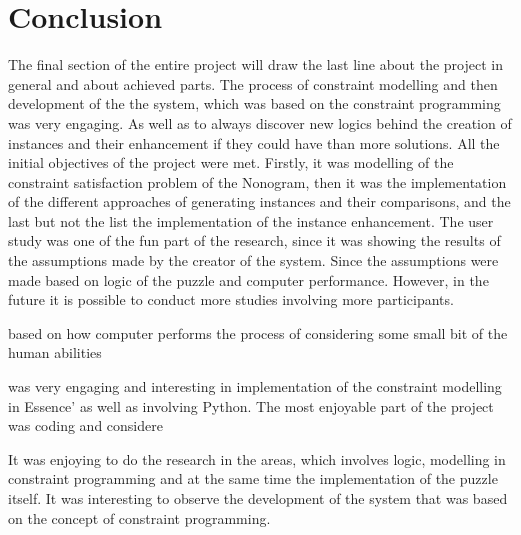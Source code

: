 \section{Conclusion}
The final section of the entire project will draw the last line about the project in general and about achieved parts. The process of constraint modelling and then development of the the system, which was based on the constraint programming was very engaging. As well as to always discover new logics behind the creation of instances and their enhancement if they could have than more solutions. All the initial objectives of the project were met. Firstly, it was modelling of the constraint satisfaction problem of the Nonogram, then it was the implementation of the different approaches of generating instances and their comparisons, and the last but not the list the implementation of the instance enhancement. The user study was one of the fun part of the research, since it was showing the results of the assumptions made  by the creator of the system. Since the assumptions were made based on logic of the puzzle and computer performance. However, in the future it is possible to conduct more studies involving more participants.

 based on how computer performs the process of  considering some small bit of the human abilities 

 was very engaging and interesting in implementation of the constraint modelling in Essence' as well as involving Python. The most enjoyable part of the project was coding and considere

It was enjoying to do the research in the areas, which involves logic, modelling in constraint programming and at the same time the implementation of the puzzle itself. It was interesting to observe the development of the system that was based on the concept of constraint programming. 



